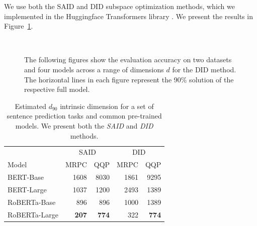 \documentclass{article} %
\begin{document}
We use both the SAID and DID subspace optimization methods, which we implemented in the Huggingface Transformers library \citep{huggingface}. We present the results in Figure~\ref{fig:sp_DID}. 


\begin{figure}
  \centering
   \\
  \caption{The following figures show the evaluation accuracy on two datasets and four models across a range of dimensions $d$ for the DID method. The horizontal lines in each figure represent the 90\% solution of the respective full model.} \label{fig:sp_DID}
\end{figure}


\begin{table}
\vspace{-2em}
\centering
\small
\begin{tabular}{lrrrr}\\\toprule 
    & \multicolumn{2}{c}{SAID}  & \multicolumn{2}{c}{DID} \\ \cmidrule(lr){2-3}\cmidrule(lr){4-5} 
Model & MRPC & QQP & MRPC & QQP \\\midrule
BERT-Base & 1608 & 8030 & 1861 & 9295 \\  
BERT-Large & 1037 & 1200& 2493 & 1389\\  \midrule
RoBERTa-Base & 896 & 896& 1000 & 1389 \\  
RoBERTa-Large & \bf{207} & \bf{774}& 322 & \bf{774}\\  \bottomrule
\end{tabular}
\caption{Estimated $d_{90}$ intrinsic dimension for a set of sentence prediction tasks and common pre-trained models. We present both the \textit{SAID} and \textit{DID} methods.}
\label{tab:mrpc_qqp_id}
\end{table} 
\end{document}

